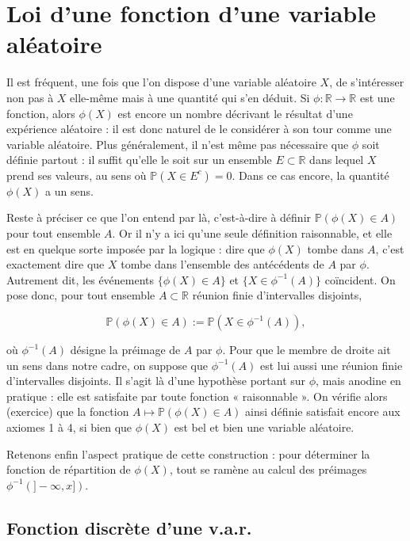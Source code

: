 \section{Loi d'une fonction d'une variable aléatoire}

Il est fréquent, une fois que l'on dispose d'une variable aléatoire $X$, de s'intéresser non pas à $X$ elle-même mais à une quantité qui s'en déduit. Si $\phi : \mathbb{R} \to \mathbb{R}$ est une fonction, alors $\phi(X)$ est encore un nombre décrivant le résultat d'une expérience aléatoire : il est donc naturel de le considérer à son tour comme une variable aléatoire. Plus généralement, il n'est même pas nécessaire que $\phi$ soit définie partout : il suffit qu'elle le soit sur un ensemble $E \subset \mathbb{R}$ dans lequel $X$ prend ses valeurs, au sens où $\mathbb{P}(X \in E^c) = 0$. Dans ce cas encore, la quantité $\phi(X)$ a un sens.

Reste à préciser ce que l'on entend par là, c'est-à-dire à définir $\mathbb{P}(\phi(X) \in A)$ pour tout ensemble $A$. Or il n'y a ici qu'une seule définition raisonnable, et elle est en quelque sorte imposée par la logique : dire que $\phi(X)$ tombe dans $A$, c'est exactement dire que $X$ tombe dans l'ensemble des antécédents de $A$ par $\phi$. Autrement dit, les événements $\{\phi(X) \in A\}$ et $\{X \in \phi^{-1}(A)\}$ coïncident. On pose donc, pour tout ensemble $A \subset \mathbb{R}$ réunion finie d'intervalles disjoints,

$$
\mathbb{P}(\phi(X) \in A) := \mathbb{P}(X \in \phi^{-1}(A)),
$$

où $\phi^{-1}(A)$ désigne la préimage de $A$ par $\phi$. Pour que le membre de droite ait un sens dans notre cadre, on suppose que $\phi^{-1}(A)$ est lui aussi une réunion finie d'intervalles disjoints. Il s'agit là d'une hypothèse portant sur $\phi$, mais anodine en pratique : elle est satisfaite par toute fonction « raisonnable ». On vérifie alors (exercice) que la fonction $A \mapsto \mathbb{P}(\phi(X) \in A)$ ainsi définie satisfait encore aux axiomes 1 à 4, si bien que $\phi(X)$ est bel et bien une variable aléatoire.

Retenons enfin l'aspect pratique de cette construction : pour déterminer la fonction de répartition de $\phi(X)$, tout se ramène au calcul des préimages $\phi^{-1}(]-\infty, x])$.

\subsection{Fonction discrète d'une v.a.r.}

